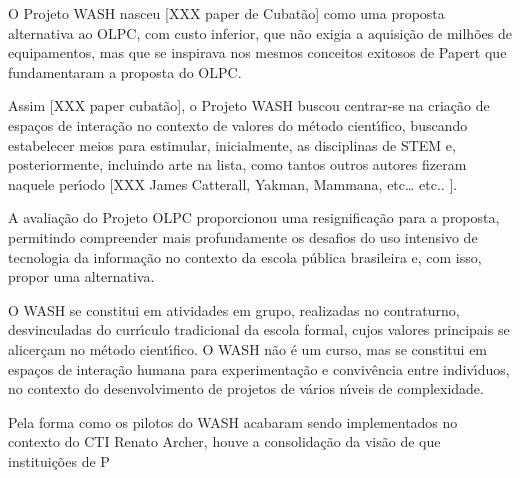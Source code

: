 \documentclass[
12pt,		%
openright,	%
twoside,  %
a4paper,			%
chapter=TITLE,		%
english,			%
french,				%
spanish,			%
brazil				%
]{USPSC-classe/USPSC_RedarTex}
\begin{document}
O Projeto WASH nasceu [XXX paper de Cubat\~ao] como uma proposta alternativa ao OLPC, com custo inferior, que n\~ao exigia a aquisi\c{c}\~ao de milh\~oes de equipamentos, mas que se inspirava nos mesmos conceitos exitosos de Papert que fundamentaram a proposta do OLPC.










Assim [XXX paper cubat\~ao], o Projeto WASH buscou centrar-se na cria\c{c}\~ao de espa\c{c}os de intera\c{c}\~ao no contexto de valores do m\'etodo cient\'{\i}fico, buscando estabelecer meios para estimular, inicialmente, as disciplinas de STEM e, posteriormente, incluindo arte na lista, como tantos outros autores fizeram naquele per\'{\i}odo [XXX James Catterall, Yakman, Mammana, etc… etc.. ].










A avalia\c{c}\~ao do Projeto OLPC proporcionou uma resignifica\c{c}\~ao para a proposta, permitindo compreender mais profundamente os desafios do uso intensivo de tecnologia da informa\c{c}\~ao no contexto da escola p\'ublica brasileira e, com isso, propor uma alternativa.










O WASH se constitui em atividades em grupo, realizadas no contraturno, desvinculadas do curr\'{\i}culo tradicional da escola formal, cujos valores principais se alicer\c{c}am no m\'etodo cient\'{\i}fico. O WASH n\~ao \'e um curso, mas se constitui em espa\c{c}os de intera\c{c}\~ao humana para experimenta\c{c}\~ao e conviv\^encia entre indiv\'{\i}duos, no contexto do desenvolvimento de projetos de v\'arios n\'{\i}veis de complexidade.










Pela forma como os pilotos do WASH acabaram sendo implementados no contexto do CTI Renato Archer, houve a consolida\c{c}\~ao da vis\~ao de que institui\c{c}\~oes de P
\end{document}
